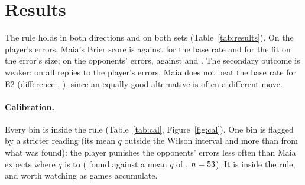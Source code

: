 \documentclass[11pt]{article}
\begin{document}
\section{Results}

The rule holds in both directions and on both sets (Table~\ref{tab:results}). On the player's
errors, Maia's Brier score is \PlayerBrier{} against \PlayerBrierBase{} for the base rate and
\PlayerBrierSize{} for the fit on the error's size; on the opponents' errors, \OppBrier{} against
\OppBrierBase{} and \OppBrierSize. The secondary outcome is weaker: on all replies to the player's
errors, Maia does not beat the base rate for E2 (difference \AllPlayerETwoDiff,
\AllPlayerETwoCI), since an equally good alternative is often a different move.

\begin{table}[!htbp]
\centering\scriptsize
\setlength{\tabcolsep}{3.5pt}
\ResultTable
\caption{Brier scores for E1 (the punishing reply is played): Maia's odds ($q$), the base rate
(\emph{base}) and the fit on the error's size (\emph{size}), both leaving one game out, and the
paired differences with 95\% bootstrap intervals over games. Events with games in parentheses;
\emph{punished} is the share of E1.}
\label{tab:results}
\end{table}

\paragraph{Calibration.} Every bin is inside the rule (Table~\ref{tab:cal},
Figure~\ref{fig:cal}). One bin is flagged by a stricter reading (its mean $q$ outside the Wilson
interval and more than \BinGap{} from what was found): the player punishes the opponents' errors
less often than Maia expects where $q$ is \SoftLo{} to \SoftHi{} (\SoftFound{} found against a
mean $q$ of \SoftQ, $n = 53$). It is inside the rule, and worth watching as games accumulate.

\begin{table}[!htbp]
\centering\small
\CalTable
\caption{Calibration on verified replies: by bin of $q$, its mean, the share of punishing replies
found, and the number of events. $^{*}$ flagged by the stricter reading.}
\label{tab:cal}
\end{table}
\end{document}
